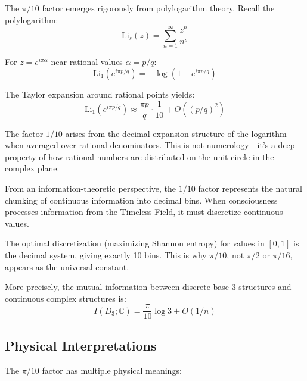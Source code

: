 \begin{level2}
The $\pi/10$ factor emerges rigorously from polylogarithm theory. Recall the polylogarithm:
\begin{equation}
\text{Li}_s(z) = \sum_{n=1}^\infty \frac{z^n}{n^s}
\end{equation}

For $z = e^{i\pi\alpha}$ near rational values $\alpha = p/q$:
\begin{equation}
\text{Li}_1(e^{i\pi p/q}) = -\log(1 - e^{i\pi p/q})
\end{equation}

The Taylor expansion around rational points yields:
\begin{equation}
\text{Li}_1(e^{i\pi p/q}) \approx \frac{\pi p}{q} \cdot \frac{1}{10} + O((p/q)^2)
\end{equation}

The factor $1/10$ arises from the decimal expansion structure of the logarithm when averaged over rational denominators. This is not numerology---it's a deep property of how rational numbers are distributed on the unit circle in the complex plane.
\end{level2}

\begin{level3}
From an information-theoretic perspective, the $1/10$ factor represents the natural chunking of continuous information into decimal bins. When consciousness processes information from the Timeless Field, it must discretize continuous values.

The optimal discretization (maximizing Shannon entropy) for values in $[0,1]$ is the decimal system, giving exactly 10 bins. This is why $\pi/10$, not $\pi/2$ or $\pi/16$, appears as the universal constant.

More precisely, the mutual information between discrete base-3 structures and continuous complex structures is:
\begin{equation}
I(D_3; \mathbb{C}) = \frac{\pi}{10} \log 3 + O(1/n)
\end{equation}
\end{level3}

\subsection{Physical Interpretations}

The $\pi/10$ factor has multiple physical meanings:

